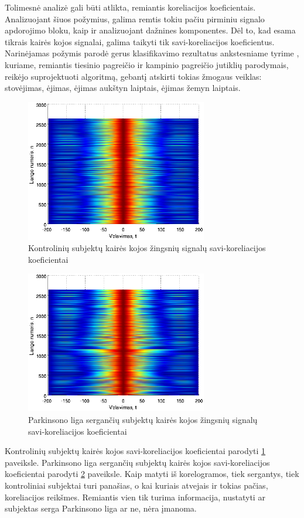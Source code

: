 \documentclass[]{vgtuef}
\begin{document}
Tolimesnė analizė gali būti atlikta, remiantis koreliacijos koeficientais. Analizuojant šiuos požymius, galima remtis tokiu pačiu pirminiu signalo apdorojimo bloku, kaip ir analizuojant dažnines komponentes. Dėl to, kad esama tikrais kairės kojos signalai, galima taikyti tik savi-koreliacijos koeficientus. Narinėjamas požymis parodė gerus klasifikavimo rezultatus ankstesniame tyrime \cite{mano_darbas}, kuriame, remiantis tiesinio pagreičio ir kampinio pagreičio jutiklių parodymais, reikėjo suprojektuoti algoritmą, gebantį atskirti tokias žmogaus veiklas: stovėjimas, ėjimas, ėjimas aukštyn laiptais, ėjimas žemyn laiptais.

\begin{figure}[!t]
  \centering
  \includegraphics[width=300px]{figures/co_corr.eps}
  \caption{Kontrolinių subjektų kairės kojos žingsnių signalų savi-koreliacijos koeficientai}
  \label{fig:co_corr}
\end{figure}

\begin{figure}[!t]
  \centering
  \includegraphics[width=300px]{figures/pt_corr.eps}
  \caption{Parkinsono liga sergančių subjektų kairės kojos žingsnių signalų savi-koreliacijos koeficientai}
  \label{fig:pt_corr}
\end{figure}

Kontrolinių subjektų kairės kojos savi-koreliacijos koeficientai parodyti \ref{fig:co_corr} paveiksle. Parkinsono liga sergančių subjektų kairės kojos savi-koreliacijos koeficientai parodyti \ref{fig:pt_corr} paveiksle. Kaip matyti iš korelogramos, tiek sergantys, tiek kontroliniai subjektai turi panašias, o kai kuriais atvejais ir tokias pačias, koreliacijos reikšmes. Remiantis vien tik turima informacija, nustatyti ar subjektas serga Parkinsono liga ar ne, nėra įmanoma.
\end{document}
